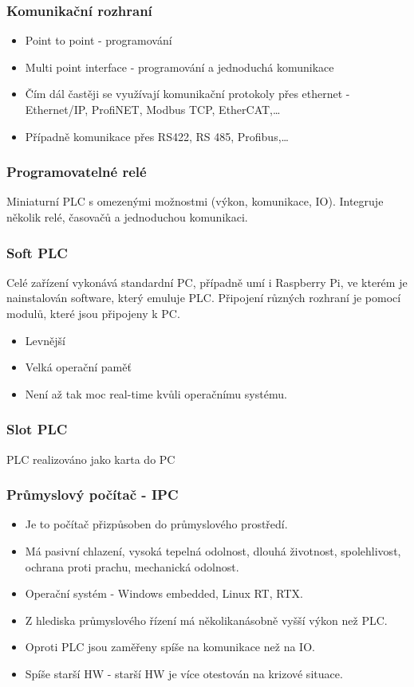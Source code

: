 \subsubsection*{Komunikační rozhraní}
\begin{itemize}
    \item Point to point - programování
    \item Multi point interface - programování a jednoduchá komunikace
    \item Čím dál častěji se využívají komunikační protokoly přes ethernet - Ethernet/IP, ProfiNET, Modbus TCP, EtherCAT,\dots
    \item Případně komunikace přes RS422, RS 485, Profibus,\dots
\end{itemize}

\subsubsection*{Programovatelné relé}
Miniaturní PLC s omezenými možnostmi (výkon, komunikace, IO). Integruje několik relé, časovačů a jednoduchou komunikaci.

\subsubsection*{Soft PLC}
Celé zařízení vykonává standardní PC, případně umí i Raspberry Pi, ve kterém je nainstalován software, který emuluje PLC. Připojení různých rozhraní je pomocí modulů, které jsou připojeny k PC.
\begin{itemize}
    \item Levnější
    \item Velká operační paměť
    \item Není až tak moc real-time kvůli operačnímu systému.
\end{itemize}

\subsubsection*{Slot PLC}
PLC realizováno jako karta do PC

\subsubsection*{Průmyslový počítač - IPC}
\begin{itemize}
    \item Je to počítač přizpůsoben do průmyslového prostředí.
    \item Má pasivní chlazení, vysoká tepelná odolnost, dlouhá životnost, spolehlivost, ochrana proti prachu, mechanická odolnost.
    \item Operační systém - Windows embedded, Linux RT, RTX.
    \item Z hlediska průmyslového řízení má několikanásobně vyšší výkon než PLC.
    \item Oproti PLC jsou zaměřeny spíše na komunikace než na IO.
    \item Spíše starší HW - starší HW je více otestován na krizové situace.
\end{itemize}


